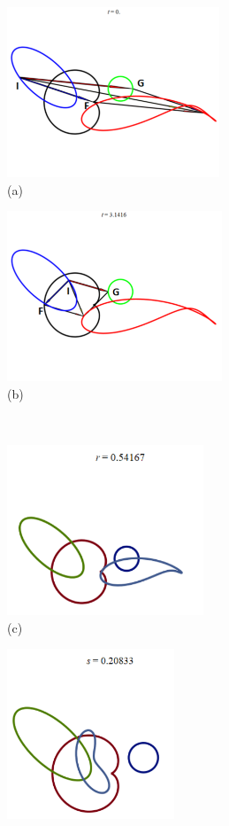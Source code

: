 \documentclass[12pt,a4paper]{article}%
\begin{document}
\begin{figure}
\begin{center}
\parbox[b]{2.8in}{\begin{center}
\includegraphics[height=2.0in,trim=0mm 0mm 0mm 15mm,clip,keepaspectratio]{IF+IG-crop.pdf}
\\
(a)
\end{center}}
\qquad
\parbox[b]{2.8in}{\begin{center}
\includegraphics[height=2.0in,trim=0mm 0mm 0mm 15mm,clip,keepaspectratio]{IF+IG_Pi-crop.pdf}
\\
(b)
\end{center}}
\\
\parbox[b]{2.8in}{\begin{center}
\includegraphics[height=2.0in,trim=0mm 0mm 0mm 15mm,clip,keepaspectratio]{PJH75H1C-crop.pdf}
\\
(c)
\end{center}}
\qquad
\parbox[b]{2.8in}{\begin{center}
\includegraphics[height=2.0in,trim=0mm 0mm 0mm 15mm,clip,keepaspectratio]{PJH75H1D-crop.pdf}

\end{center}}
\end{center}
\end{figure}
\end{document}
